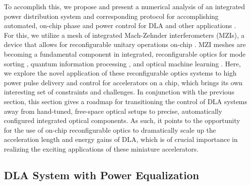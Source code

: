 To accomplish this, we propose and present a numerical analysis of an integrated power distribution system and corresponding protocol for accomplishing automated, on-chip phase and power control for DLA and other applications \cite{hughes_reconfigurable_2019}. For this, we utilize a mesh of integrated Mach-Zehnder interferometers (MZIs), a device that allows for reconfigurable unitary operations on-chip \cite{miller_selfconfiguring_2013,Miller2015}.  MZI meshes are becoming a fundamental component in integrated, reconfigurable optics for mode sorting \cite{miller_sorting_2015,Annoni2017,Miller2017,miller_self-configuring_2018}, quantum information processing \cite{Harris2017,metcalf_multiphoton_2013,aspuru-guzik_photonic_2012,obrien_photonic_2009}, and optical machine learning \cite{shen2017deep, hughes2018training}.  Here, we explore the novel application of these reconfigurable optics systems to high power pulse delivery and control for accelerators on a chip, which brings its own interesting set of constraints and challenges.  In conjunction with the previous section, this section gives a roadmap for transitioning the control of DLA systems away from hand-tuned, free-space optical setups to precise, automatically configured integrated optical components.  As such, it points to the opportunity for the use of on-chip reconfigurable optics to dramatically scale up the acceleration length and energy gains of DLA, which is of crucial importance in realizing the exciting applications of these miniature accelerators.

\subsection{DLA System with Power Equalization}

